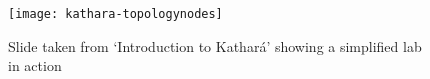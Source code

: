 \begin{figure}
  \centering
  \texttt{[image: kathara-topologynodes]}
  \caption{Slide taken from `Introduction to Kathará' showing a simplified lab in action}
  \label{fig:kathara-topologynodes}
\end{figure}
